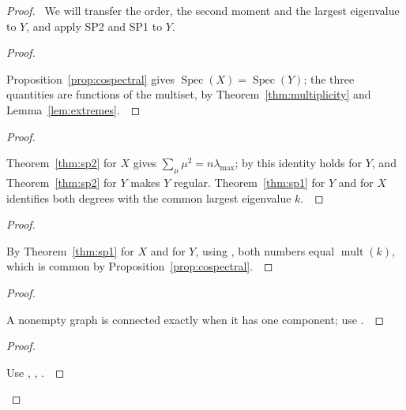 \documentclass[11pt]{amsart}
\let\qed\relax
\theoremstyle{definition}
\DeclareMathOperator{\Spec}{Spec}
\DeclareMathOperator{\mult}{mult}
\begin{document}
\begin{corollary}\label{cor:regular-mates}
\mbox{}\par\nobreak
{}
\end{corollary}
\begin{proof}
\pfsketch\ We will transfer the order, the second moment and the largest eigenvalue to $Y$, and apply SP2 and SP1 to $Y$.
\begin{proof}
\pf\ \raggedright Proposition~\ref{prop:cospectral} gives $\Spec(X)=\Spec(Y)$; the three quantities are functions of the multiset, by Theorem~\ref{thm:multiplicity} and Lemma~\ref{lem:extremes}.~\qed
\end{proof}
\begin{proof}
\pf\ \raggedright Theorem~\ref{thm:sp2} for $X$ gives $\sum_\mu\mu^2=n\lambda_{\max}$; by  this identity holds for $Y$, and Theorem~\ref{thm:sp2} for $Y$ makes $Y$ regular. Theorem~\ref{thm:sp1} for $Y$ and for $X$ identifies both degrees with the common largest eigenvalue $k$.~\qed
\end{proof}
\begin{proof}
\pf\ \raggedright By Theorem~\ref{thm:sp1} for $X$ and for $Y$, using , both numbers equal $\mult(k)$, which is common by Proposition~\ref{prop:cospectral}.~\qed
\end{proof}
\begin{proof}
\pf\ \raggedright A nonempty graph is connected exactly when it has one component; use .~\qed
\end{proof}
\qedstep
\begin{proof}
\pf\ \raggedright Use , , .~\qed
\end{proof}
\end{proof}
\end{document}
